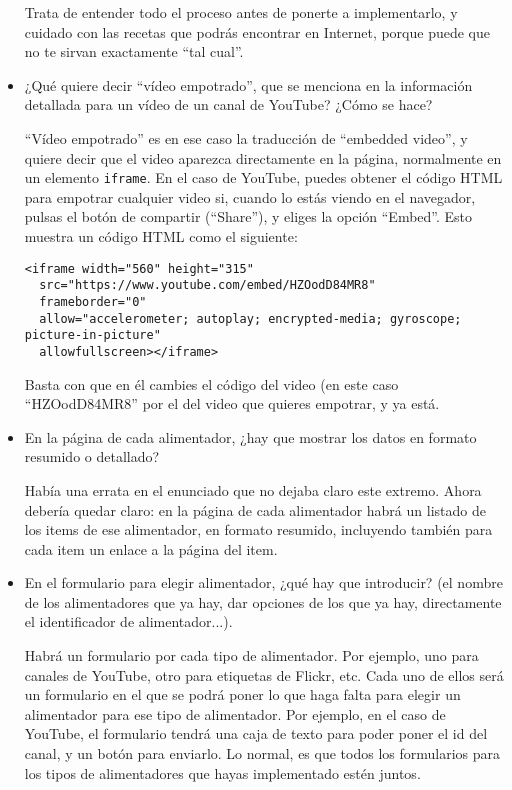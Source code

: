 \begin{itemize}
  Trata de entender todo el proceso antes de ponerte a implementarlo, y cuidado con las recetas que podrás encontrar en Internet, porque puede que no te sirvan exactamente ``tal cual''.
  
\item ¿Qué quiere decir ``vídeo empotrado'', que se menciona en la información detallada para un vídeo de un canal de YouTube? ¿Cómo se hace?

  ``Vídeo empotrado'' es en ese caso la traducción de ``embedded video'', y quiere decir que el video aparezca directamente en la página, normalmente en un elemento \verb|iframe|. En el caso de YouTube, puedes obtener el código HTML para empotrar cualquier video si, cuando lo estás viendo en el navegador, pulsas el botón de compartir (``Share''), y eliges la opción ``Embed''. Esto muestra un código HTML como el siguiente:

\begin{verbatim}
<iframe width="560" height="315"
  src="https://www.youtube.com/embed/HZOodD84MR8"
  frameborder="0"
  allow="accelerometer; autoplay; encrypted-media; gyroscope; picture-in-picture"
  allowfullscreen></iframe>
\end{verbatim}

Basta con que en él cambies el código del video (en este caso ``HZOodD84MR8''  por el del video que quieres empotrar, y ya está.

\item En la página de cada alimentador, ¿hay que mostrar los datos en formato resumido o detallado?

  Había una errata en el enunciado que no dejaba claro este extremo. Ahora debería quedar claro: en la página de cada alimentador habrá un listado de los items de ese alimentador, en formato resumido, incluyendo también para cada item un enlace a la página del item.
  
\item En el formulario para elegir alimentador, ¿qué hay que introducir? (el nombre de los alimentadores que ya hay, dar opciones de los que ya hay, directamente el identificador de alimentador...).

  Habrá un formulario por cada tipo de alimentador. Por ejemplo, uno para canales de YouTube, otro para etiquetas de Flickr, etc. Cada uno de ellos será un formulario en el que se podrá poner lo que haga falta para elegir un alimentador para ese tipo de alimentador. Por ejemplo, en el caso de YouTube, el formulario tendrá una caja de texto para poder poner el id del canal, y un botón para enviarlo. Lo normal, es que todos los formularios para los tipos de alimentadores que hayas implementado estén juntos.


\end{itemize}
